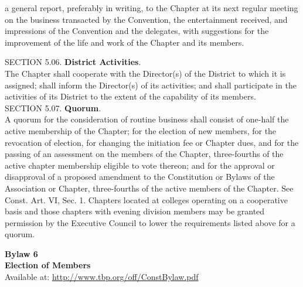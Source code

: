 \begin{optionalpart}
\begin{enumerate}
a general report, preferably in writing, to the Chapter at its next regular meeting on the 
business transacted by the Convention, the entertainment received, and impressions of the 
Convention and the delegates, with suggestions for the improvement of the life and work 
of the Chapter and its members.
\end{enumerate}
SECTION 5.06. {\bf District Activities}.\\
 The Chapter shall cooperate with the Director(s) 
of the District to which it is assigned; shall inform the Director(s) of its activities; and shall 
participate in the activities of its District to the extent of the capability of its members.\\[1em]
SECTION 5.07. {\bf Quorum}.\\
 A quorum for the consideration of routine business shall consist 
of one-half the active membership of the Chapter; for the election of new members, for the 
revocation of election, for changing the initiation fee or Chapter dues, and for the passing of 
an assessment on the members of the Chapter, three-fourths of the active chapter membership 
eligible to vote thereon; and for the approval or disapproval of a proposed amendment to the 
Constitution or Bylaws of the Association or Chapter, three-fourths of the active members of 
the Chapter. See Const. Art. VI, Sec. 1. Chapters located at colleges operating on a cooperative basis and those chapters with evening division members may be granted permission by 
the Executive Council to lower the requirements listed above for a quorum.\\[1em]

\begin{center}
{\bf Bylaw 6\\
Election of Members}\\
Available at: \url{http://www.tbp.org/off/ConstBylaw.pdf}
\end{center}

\end{optionalpart}